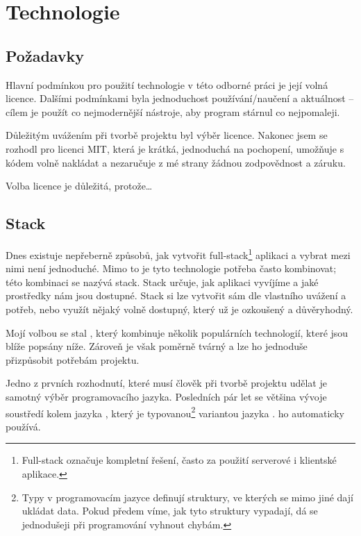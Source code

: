 \hypertarget{Technologie}{\chapter{Technologie}}

\section{Požadavky}

Hlavní podmínkou pro použití technologie v této odborné práci je její volná licence. Dalšími podmínkami byla jednoduchost používání/naučení a aktuálnost -- cílem je použít co nejmodernější nástroje, aby program stárnul co nejpomaleji.

Důležitým uvážením při tvorbě projektu byl výběr licence. Nakonec jsem se rozhodl pro licenci MIT, která je krátká, jednoduchá na pochopení, umožňuje s kódem volně nakládat a nezaručuje z mé strany žádnou zodpovědnost a záruku.\cite{choosealicense}

Volba licence je důležitá, protože\dots

\section{Stack}

Dnes existuje nepřeberně způsobů, jak vytvořit full-stack\footnote{Full-stack označuje kompletní řešení, často za použití serverové i klientské aplikace.} aplikaci a vybrat mezi nimi není jednoduché. Mimo to je tyto technologie potřeba často kombinovat; této kombinaci se nazývá stack. Stack určuje, jak aplikaci vyvíjíme a jaké prostředky nám jsou dostupné. Stack si lze vytvořit sám dle vlastního uvážení a potřeb, nebo využít nějaký volně dostupný, který už je ozkoušený a důvěryhodný.

Mojí volbou se stal , který kombinuje několik populárních technologií, které jsou blíže popsány níže. Zároveň je však poměrně tvárný a lze ho jednoduše přizpůsobit potřebám projektu.\cite{t3stack}

Jedno z prvních rozhodnutí, které musí člověk při tvorbě projektu udělat je samotný výběr programovacího jazyka. Posledních pár let se většina vývoje soustředí kolem jazyka , který je typovanou\footnote{Typy v programovacím jazyce definují struktury, ve kterých se mimo jiné dají ukládat data. Pokud předem víme, jak tyto struktury vypadají, dá se jednodušeji při programování vyhnout chybám.} variantou jazyka .  ho automaticky používá. 

